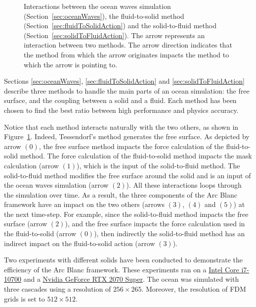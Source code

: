 \documentclass[final]{jcgt}
\def\framework{the Arc Blanc framework\xspace}
\def\ie{\emph{i.e.}\xspace}
\begin{document}
\begin{figure}
	\centering
	
	\caption{Interactions between the ocean waves simulation (Section~\ref{sec:oceanWaves}), the fluid-to-solid method (Section~\ref{sec:fluidToSolidAction}) and the solid-to-fluid method (Section~\ref{sec:solidToFluidAction}).
		The arrow represents an interaction between two methods.
		The arrow direction indicates that the method from which the arrow originates impacts the method to which the arrow is pointing to.}
	\label{fig:interactionMethods}
\end{figure}

Sections \ref{sec:oceanWaves}, \ref{sec:fluidToSolidAction} and \ref{sec:solidToFluidAction} describe three methods to handle the main parts of an ocean simulation: the free surface, and the coupling between a solid and a fluid.
Each method has been chosen to find the best ratio between high performance and physics accuracy.

Notice that each method interacts naturally with the two others, as shown in Figure~\ref{fig:interactionMethods}.
Indeed, Tessendorf's method generates the free surface.
As depicted by arrow $(0)$, the free surface method impacts the force calculation of the fluid-to-solid method.
The force calculation of the fluid-to-solid method impacts the mask calculation (arrow $(1)$), which is the input of the solid-to-fluid method.
The solid-to-fluid method modifies the free surface around the solid and is an input of the ocean waves simulation (arrow $(2)$).
All these interactions loops through the simulation over time. 
As a result, the three components of \framework have an impact on the two others (arrows $(3)$, $(4)$ and $(5)$) at the next time-step.
For example, since the solid-to-fluid method impacts the free surface (arrow $(2)$), and the free surface impacts the force calculation used in the fluid-to-solid (arrow $(0)$), then indirectly the solid-to-fluid method has an indirect impact on the fluid-to-solid action (arrow $(3)$).

Two experiments with different solids have been conducted to demonstrate the efficiency of \framework.
These experiments ran on a \href{https://www.intel.fr/content/www/fr/fr/products/sku/199316/intel-core-i710700-processor-16m-cache-up-to-4-80-ghz/specifications.html}{Intel Core i7-10700} and a \href{https://www.nvidia.com/fr-fr/geforce/graphics-cards/compare/?section=compare-20}{Nvidia GeForce RTX 2070 Super}.
The ocean was simulated with three cascades using a resolution of $256\times265$.
Moreover, the resolution of FDM grids is set to $512\times 512$.
\end{document}
